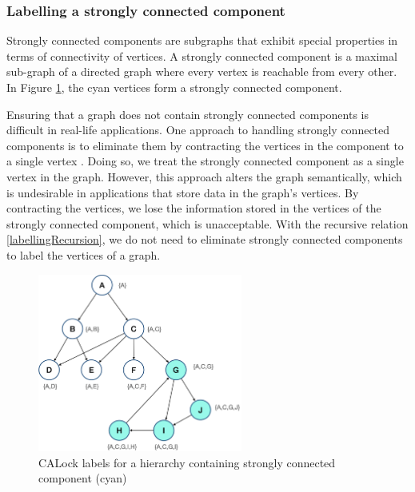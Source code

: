 \subsubsection{Labelling a strongly connected component}
Strongly connected components are subgraphs that exhibit special properties in terms of connectivity of vertices. 
A strongly connected component is a maximal sub-graph of a directed graph where every vertex is reachable from every other. 
In Figure \ref{fig:stronglyConnectedComponent}, the cyan vertices form a strongly connected component.


Ensuring that a graph does not contain strongly connected components is difficult in real-life applications. 
One approach to handling strongly connected components is to eliminate them by contracting the vertices in the component to a single vertex \cite{sharir1981strong, tarjan1972depth, cheriyan1996algorithms,walsh2006hub}. Doing so, we treat the strongly connected component as a single vertex in the graph. 
However, this approach alters the graph semantically, which is undesirable in applications that store data in the graph's vertices. By contracting the vertices, we lose the information stored in the vertices of the strongly connected component, which is unacceptable. 
With the recursive relation \ref{labellingRecursion}, we do not need to eliminate strongly connected components to label the vertices of a graph. 


\begin{figure}
	\centering
	\captionsetup{justification=centering}
	\includegraphics[width=0.6\textwidth]{figures/CALock_ConnectedComponent.png}
	\caption{CALock labels for a hierarchy containing strongly connected component (cyan)}
	\label{fig:stronglyConnectedComponent}
\end{figure}

